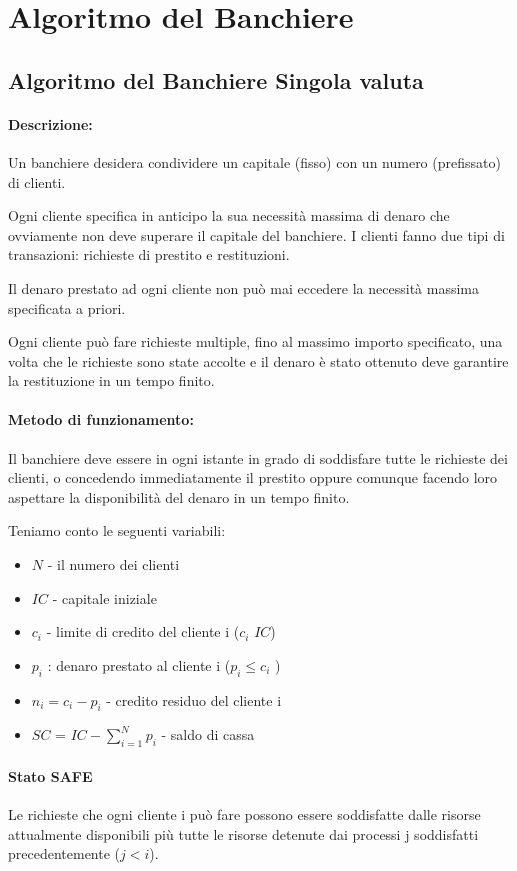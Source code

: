 \section{Algoritmo del Banchiere}
\subsection{Algoritmo del Banchiere Singola valuta}
\paragraph{Descrizione:} 
Un banchiere desidera condividere un capitale (fisso) con un numero
(prefissato) di clienti.

Ogni cliente specifica in anticipo la sua necessità massima di denaro che ovviamente non deve superare il capitale del banchiere.
I clienti fanno due tipi di transazioni: richieste di prestito
e restituzioni.

Il denaro prestato ad ogni cliente non può mai eccedere la necessità massima specificata a priori.

Ogni cliente può fare richieste multiple, fino al massimo importo specificato, una volta che le richieste sono state accolte e il denaro è stato ottenuto deve garantire la restituzione in un tempo finito.

\paragraph{Metodo di funzionamento:} Il banchiere deve essere in ogni istante in grado di soddisfare tutte le richieste dei clienti, o concedendo immediatamente il prestito oppure comunque facendo loro aspettare la disponibilità del denaro in un tempo
finito.

Teniamo conto le seguenti variabili:
\begin{itemize}
    \item $N$ - il numero dei clienti
    \item $IC$ - capitale iniziale
    \item $c_i$ - limite di credito del cliente i ($c_i$ \lt $IC$)
    \item $p_i$ : denaro prestato al cliente i ($p_i \le c_i$ )
    \item $n_i = c_i - p_i$  - credito residuo del cliente i
    \item $SC$ = $IC - \sum_{i=1}^{N}p_i$ -  saldo di cassa 
\end{itemize}

\paragraph{Stato SAFE}
Le richieste che ogni cliente i può fare possono essere soddisfatte dalle risorse attualmente disponibili più tutte le risorse detenute dai processi j soddisfatti precedentemente ($j < i$).
